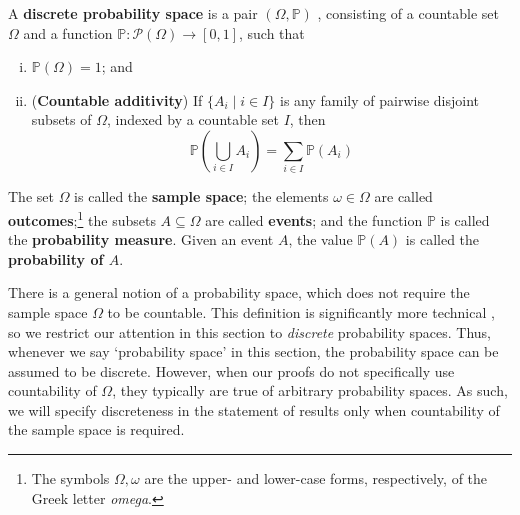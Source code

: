 \begin{definition}
\label{defDiscreteProbabilitySpace}
A \textbf{discrete probability space} is a pair $(\Omega, \mathbb{P})$ , consisting of a countable set $\Omega$ and a function $\mathbb{P} : \mathcal{P}(\Omega) \to [0,1]$, such that
\begin{enumerate}[(i)]
\item $\mathbb{P}(\Omega) = 1$; and
\item (\textbf{Countable additivity}) If $\{ A_i \mid i \in I \}$ is any family of pairwise disjoint subsets of $\Omega$, indexed by a countable set $I$, then
\[ \displaystyle \mathbb{P} \left( \bigcup_{i \in I} A_i \right) = \sum_{i \in I} \mathbb{P}(A_i) \]
\end{enumerate}
The set $\Omega$ is called the \textbf{sample space}; the elements $\omega \in \Omega$ are called \textbf{outcomes};\footnote{The symbols $\Omega,\omega$  are the upper- and lower-case forms, respectively, of the Greek letter \textit{omega}.} the subsets $A \subseteq \Omega$ are called \textbf{events}; and the function $\mathbb{P}$ is called the \textbf{probability measure}. Given an event $A$, the value $\mathbb{P}(A)$ is called the \textbf{probability of $A$}.
\end{definition}

There is a general notion of a probability space, which does not require the sample space $\Omega$ to be countable. This definition is significantly more technical%
, so we restrict our attention in this section to \textit{discrete} probability spaces. Thus, whenever we say `probability space' in this section, the probability space can be assumed to be discrete. However, when our proofs do not specifically use countability of $\Omega$, they typically are true of arbitrary probability spaces. As such, we will specify discreteness in the statement of results only when countability of the sample space is required.

